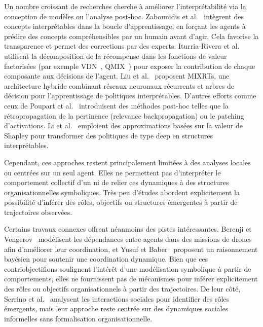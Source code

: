 Un nombre croissant de recherches cherche à améliorer l'interprétabilité via la conception de modèles ou l'analyse post-hoc. Zabounidis et al.~\cite{zabounidis2023concept} intègrent des concepts interprétables dans la boucle d'apprentissage, en forçant les agents à prédire des concepts compréhensibles par un humain avant d'agir. Cela favorise la transparence et permet des corrections par des experts. Iturria-Rivera et al.~\cite{iturria2024explainable} utilisent la décomposition de la récompense dans les fonctions de valeur factorisées (par exemple VDN~\cite{Sunehag2018}, QMIX~\cite{Tabish2018}) pour exposer la contribution de chaque composante aux décisions de l'agent. Liu et al.~\cite{liu2025} proposent MIXRTs, une architecture hybride combinant réseaux neuronaux récurrents et arbres de décision pour l'apprentissage de politiques interprétables. D'autres efforts comme ceux de Poupart et al.~\cite{poupart2025perspectives} introduisent des méthodes post-hoc telles que la rétropropagation de la pertinence (relevance backpropagation) ou le patching d'activations. Li et al.~\cite{li2025from} emploient des approximations basées sur la valeur de Shapley pour transformer des politiques de type deep  en structures interprétables.

Cependant, ces approches restent principalement limitées à des analyses locales ou centrées sur un seul agent. Elles ne permettent pas d'interpréter le comportement collectif d'un  ni de relier ces dynamiques à des structures organisationnelles symboliques. Très peu d'études abordent explicitement la possibilité d'inférer des rôles, objectifs ou structures émergentes à partir de trajectoires observées.

Certains travaux connexes offrent néanmoins des pistes intéressantes. Berenji et Vengerov~\cite{berenji2000learning} modélisent les dépendances entre agents dans des missions de drones afin d'améliorer leur coordination, et Yusuf et Baber~\cite{yusuf2020inferential} proposent un raisonnement bayésien pour soutenir une coordination dynamique. Bien que ces contriobjectifions soulignent l'intérêt d'une modélisation symbolique à partir de comportements, elles ne fournissent pas de mécanismes pour inférer explicitement des rôles ou objectifs organisationnels à partir des trajectoires. De leur côté, Serrino et al.~\cite{serrino2019finding} analysent les interactions sociales pour identifier des rôles émergents, mais leur approche reste centrée sur des dynamiques sociales informelles sans formalisation organisationnelle.

